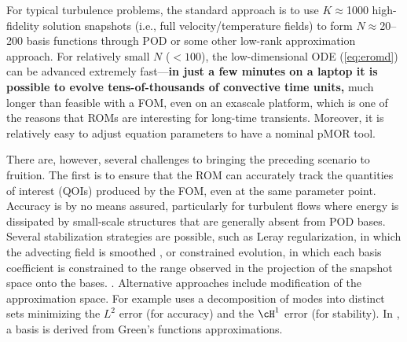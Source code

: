 For typical turbulence problems, the standard approach is to use
$K$$\approx$1000 high-fidelity solution snapshots (i.e., full
velocity/temperature fields) to form $N$$\approx$20--200 basis functions
through POD or some other low-rank approximation approach.  For relatively
small $N$ ($<100$), the low-dimensional ODE (\ref{eq:eromd}) can be advanced
extremely fast---\textbf{in just a few minutes on a laptop it is possible to
evolve tens-of-thousands of convective time units,} much longer than feasible
with a FOM, even on an exascale platform, which is one of the reasons that ROMs
are interesting for long-time transients.  Moreover, it is relatively easy to
adjust equation parameters to have a nominal pMOR tool.

There are, however, several challenges to bringing the preceding scenario to fruition.
The first is to ensure that the ROM can accurately track the quantities
of interest (QOIs) produced by the FOM, even at the same parameter point.
Accuracy is by no means assured, particularly for turbulent flows
where energy is dissipated by small-scale structures that are generally absent
from POD bases.  Several stabilization strategies are possible, such as Leray
regularization, in which the advecting field is smoothed \cite{wang2012proper}, 
or constrained evolution, in which each basis coefficient is constrained
to the range observed in the projection of the snapshot space onto the bases. 
\cite{fick18}.  Alternative approaches include modification of the approximation
space.  For example \cite{akkari19} uses a decomposition of modes
into distinct sets minimizing the $L^2$ error (for accuracy) and the $\cH^1$
error (for stability).  In \cite{khodkar2019}, a basis is derived from Green's
functions approximations.

